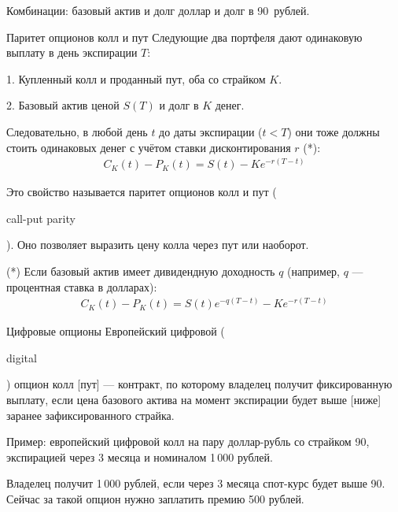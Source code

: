 \documentclass{beamer}
\newcommand{\en}[1]{\begin{otherlanguage}{english}#1\end{otherlanguage}}
\newcommand{\usdrubstrike}{90}
\newcommand{\usdrubaxisspread}{8}
\begin{document}
\begin{frame}{Комбинации: базовый актив и долг}
 доллар и долг в \usdrubstrike\ рублей.

\justifying
\centering
\end{frame}



\begin{frame}{Паритет опционов колл и пут}
\justify
Следующие два портфеля дают одинаковую выплату в день экспирации $T$:

1. Купленный колл и проданный пут, оба со страйком $K$.

2. Базовый актив ценой $S(T)$ и долг в $K$ денег.

\justify
Следовательно, в любой день $t$ до даты экспирации ($t<T$) они тоже должны стоить одинаковых денег с учётом ставки дисконтирования $r$ (*):
\begin{align*}
C_K(t) - P_K(t) = S(t) - Ke^{-r(T-t)}
\end{align*}

\justify
Это свойство называется \alert{паритет опционов колл и пут} (\en{call-put parity}). Оно позволяет выразить цену колла через пут или наоборот.

\justify
(*) Если базовый актив имеет дивидендную доходность $q$ (например, $q$ --- процентная ставка в долларах):
\begin{align*}
C_K(t) - P_K(t) = S(t)e^{-q(T-t)} - Ke^{-r(T-t)}
\end{align*}
\end{frame}



\begin{frame}{Цифровые опционы}
\justify
Европейский \alert{цифровой} (\en{digital}) опцион колл [пут] --- контракт, по которому 
владелец получит фиксированную выплату, если цена базового актива на момент экспирации 
будет выше [ниже] заранее зафиксированного страйка.

\justify
Пример: европейский цифровой колл на пару доллар-рубль со страйком \usdrubstrike, экспирацией 
через 3 месяца и номиналом 1\,000 рублей.

\justify
Владелец получит 1\,000 рублей, если через 3 
месяца спот-курс будет выше \usdrubstrike. Сейчас за такой опцион нужно заплатить премию 500 
рублей.
\end{frame}
\end{document}
